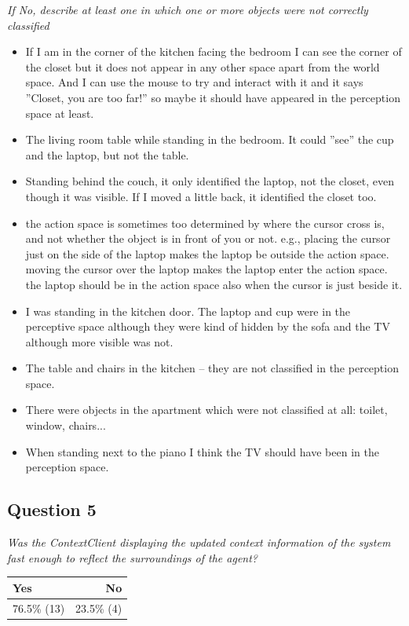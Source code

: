 \emph{If No, describe at least one in which one or more objects were not correctly classified}
\begin{itemize}
	\item If I am in the corner of the kitchen facing the bedroom I can see the corner of the closet but it does not appear in any other space apart from the world space. And I can use the mouse to try and interact with it and it says ''Closet, you are too far!'' so maybe it should have appeared in the perception space at least.
	\item The living room table while standing in the bedroom. It could ''see'' the cup and the laptop, but not the table.
	\item Standing behind the couch, it only identified the laptop, not the closet, even though it was visible. If I moved a little back, it identified the closet too.
	\item the action space is sometimes too determined by where the cursor cross is, and not whether the object is in front of you or not. e.g., placing the cursor just on the side of the laptop makes the laptop be outside the action space. moving the cursor over the laptop makes the laptop enter the action space. the laptop should be in the action space also when the cursor is just beside it.
	\item I was standing in the kitchen door. The laptop and cup were in the perceptive space although they were kind of hidden by the sofa and the TV although more visible was not.
	\item The table and chairs in the kitchen -- they are not classified in the perception space.
	\item There were objects in the apartment which were not classified at all: toilet, window, chairs... 
	\item When standing next to the piano I think the TV should have been in the perception space.

\end{itemize}

\subsection{Question 5}\label{question1:5}
\emph{Was the ContextClient displaying the updated context information of the system fast enough to reflect the surroundings of the agent?}
\begin{table}[H]
	\begin{center}
		\small \begin{tabular*}{0.35\columnwidth}{lr}
			\\ \hline \hline
			Yes & No \\ \hline \hline

		 	76.5\% (13) & 23.5\% (4)\\ \hline
		\end{tabular*}
	\end{center}
\end{table}

